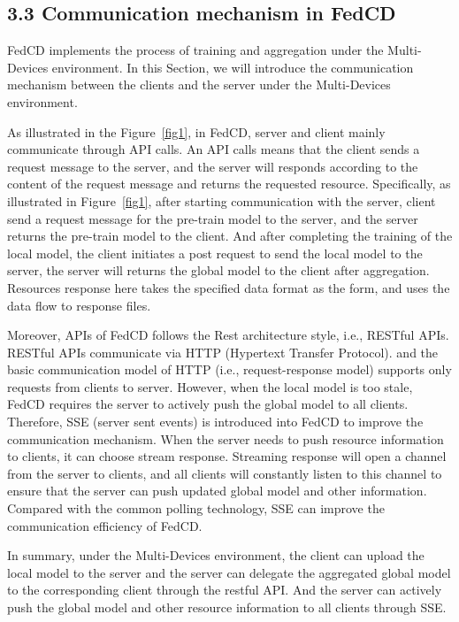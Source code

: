 \documentclass[twoside,twocolumn]{article}
\begin{document}
\subsection{3.3 Communication mechanism in FedCD}

	FedCD implements the process of training and aggregation under the Multi-Devices environment. In this Section, we will introduce the communication mechanism between the clients and the server under the Multi-Devices environment.

	As illustrated in the Figure~\ref{fig1}, in FedCD, server and client mainly communicate through API calls. An API calls means that the client sends a request message to the server, and the server will responds according to the content of the request message and returns the requested resource. Specifically, as illustrated in Figure~\ref{fig1}, after starting communication with the server, client send a request message for the pre-train model to the server, and the server returns the pre-train model to the client. And after completing the training of the local model, the client initiates a post request to send the local model to the server, the server will returns the global model to the client after aggregation. Resources response here takes the specified data format as the form, and uses the data flow to response files. 

	Moreover, APIs of FedCD follows the Rest architecture style, i.e., RESTful APIs. RESTful APIs communicate via HTTP (Hypertext Transfer Protocol). and the basic communication model of HTTP (i.e., request-response model) supports only requests from clients to server. However, when the local model is too stale, FedCD requires the server to actively push the global model to all clients. Therefore, SSE (server sent events) is introduced into FedCD to improve the communication mechanism. When the server needs to push resource information to clients, it can choose stream response. Streaming response will open a channel from the server to clients, and all clients will constantly listen to this channel to ensure that the server can push updated global model and other information. Compared with the common polling technology, SSE can improve the communication efficiency of FedCD.

	In summary, under the Multi-Devices environment, the client can upload the local model to the server and the server can delegate the aggregated global model to the corresponding client through the restful API. And the server can actively push the global model and other resource information to all clients through SSE.
\end{document}
